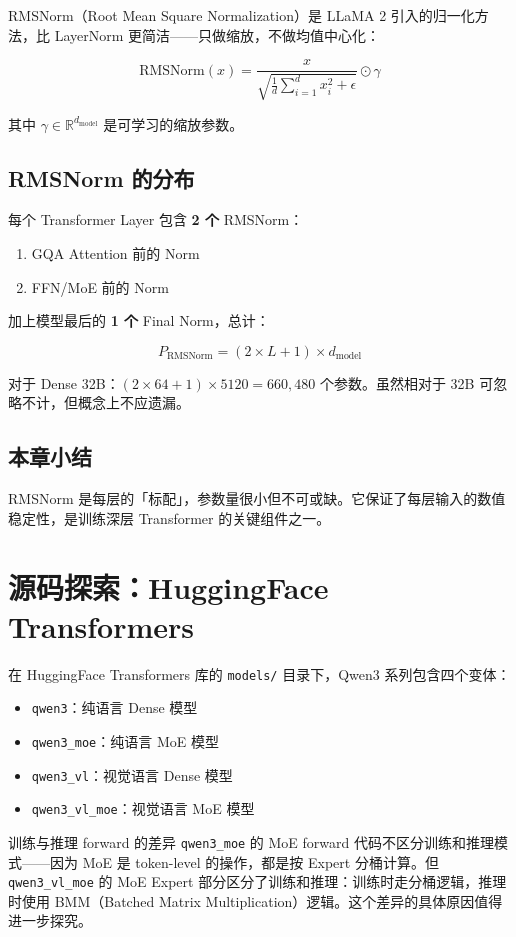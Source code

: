 \documentclass[a4paper]{article}
\begin{document}
RMSNorm（Root Mean Square Normalization）是 LLaMA 2 引入的归一化方法，比 LayerNorm 更简洁——只做缩放，不做均值中心化：

$$
\text{RMSNorm}(x) = \frac{x}{\sqrt{\frac{1}{d}\sum_{i=1}^d x_i^2 + \epsilon}} \odot \gamma
$$

其中 $\gamma \in \mathbb{R}^{d_{\text{model}}}$ 是可学习的缩放参数。

\subsection{RMSNorm 的分布}

每个 Transformer Layer 包含 \textbf{2 个} RMSNorm：
\begin{enumerate}
  \item GQA Attention 前的 Norm
  \item FFN/MoE 前的 Norm
\end{enumerate}

加上模型最后的 \textbf{1 个} Final Norm，总计：

$$
P_{\text{RMSNorm}} = (2 \times L + 1) \times d_{\text{model}}
$$

对于 Dense 32B：$(2 \times 64 + 1) \times 5120 = 660{,}480$ 个参数。虽然相对于 32B 可忽略不计，但概念上不应遗漏。

\subsection{本章小结}

RMSNorm 是每层的「标配」，参数量很小但不可或缺。它保证了每层输入的数值稳定性，是训练深层 Transformer 的关键组件之一。

\section{源码探索：HuggingFace Transformers}

在 HuggingFace Transformers 库的 \texttt{models/} 目录下，Qwen3 系列包含四个变体：
\begin{itemize}
  \item \texttt{qwen3}：纯语言 Dense 模型
  \item \texttt{qwen3\_moe}：纯语言 MoE 模型
  \item \texttt{qwen3\_vl}：视觉语言 Dense 模型
  \item \texttt{qwen3\_vl\_moe}：视觉语言 MoE 模型
\end{itemize}

\begin{knowledgebox}{训练与推理 forward 的差异}
\texttt{qwen3\_moe} 的 MoE forward 代码不区分训练和推理模式——因为 MoE 是 token-level 的操作，都是按 Expert 分桶计算。但 \texttt{qwen3\_vl\_moe} 的 MoE Expert 部分区分了训练和推理：训练时走分桶逻辑，推理时使用 BMM（Batched Matrix Multiplication）逻辑。这个差异的具体原因值得进一步探究。
\end{knowledgebox}
\end{document}
